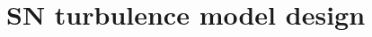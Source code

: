 \documentclass[preprint2]{aastex63}
\begin{document}

\section{SN turbulence model design} \label{sec:model}
\end{document}
